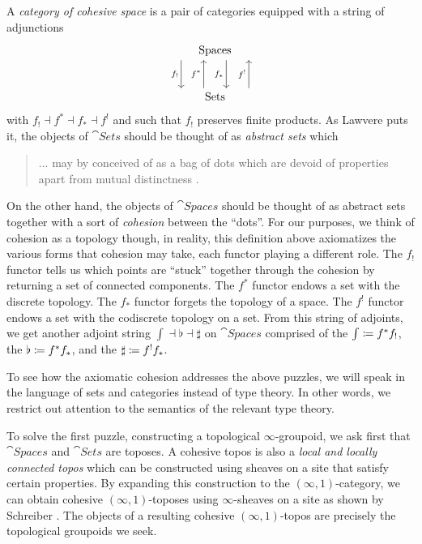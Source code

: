 \documentclass{amsart}
\begin{document}
A \emph{category of cohesive space} is a pair of categories
equipped with a string of adjunctions
\[
\begin{tikzcd}[row sep = 25pt]
  \cat{Spaces}
    \arrow[d, shift left = 1em, "f_\ast"']
    \arrow[d, shift right = 3em, "f_!"'] \\
  \cat{Sets}
    \arrow[u, shift left = 1em, "f^\ast"]
    \arrow[u, shift right = 3em, "f^!"] 
\end{tikzcd} 
\]
with $ f_! \dashv f^\ast \dashv f_\ast \dashv f^! $ and such
that $ f_! $ preserves finite products.  As Lawvere puts it,
the objects of $ \cat{Sets} $ should be thought of as
\emph{abstract sets} which
\begin{quote}
  ... may by conceived of as a bag of dots which are devoid
  of properties apart from mutual distinctness \cite{lawvere:cohesive}.
\end{quote}
On the other hand, the objects of $ \cat{Spaces} $ should be
thought of as abstract sets together with a sort of
\emph{cohesion} between the ``dots''. For our purposes, we
think of cohesion as a topology though, in reality, this
definition above axiomatizes the various forms that cohesion
may take, each functor playing a different role.  The
$ f_! $ functor tells us which points are ``stuck'' together
through the cohesion by returning a set of connected
components. The $ f^\ast $ functor endows a set with the
discrete topology. The $ f_\ast $ functor forgets the
topology of a space. The $ f^! $ functor endows a set with
the codiscrete topology on a set.  From this string of
adjoints, we get another adjoint string
$ \int \dashv \flat \dashv \sharp $ on $ \cat{Spaces} $
comprised of the 
$ \int \coloneqq f^\ast f_! $, the 
$ \flat \coloneqq f^\ast f_\ast $, and the 
$ \sharp \coloneqq f^! f_\ast $.

To see how the axiomatic cohesion addresses the above
puzzles, we will speak in the language of sets and
categories instead of type theory. In other words, we
restrict out attention to the semantics of the relevant type
theory.

To solve the first puzzle, constructing a topological
$ \infty $-groupoid, we ask first that $ \cat{Spaces} $ and
$ \cat{Sets} $ are toposes. A cohesive topos is also a
\emph{local and locally connected topos} which can be
constructed using sheaves on a site that satisfy certain
properties. By expanding this construction to the
$ (\infty,1) $-category, we can obtain cohesive
$ (\infty,1) $-toposes using $ \infty $-sheaves on a site as
shown by Schreiber \cite{schreib:diff}.  The objects of a
resulting cohesive $ (\infty,1) $-topos are precisely the
topological groupoids we seek.
\end{document}
